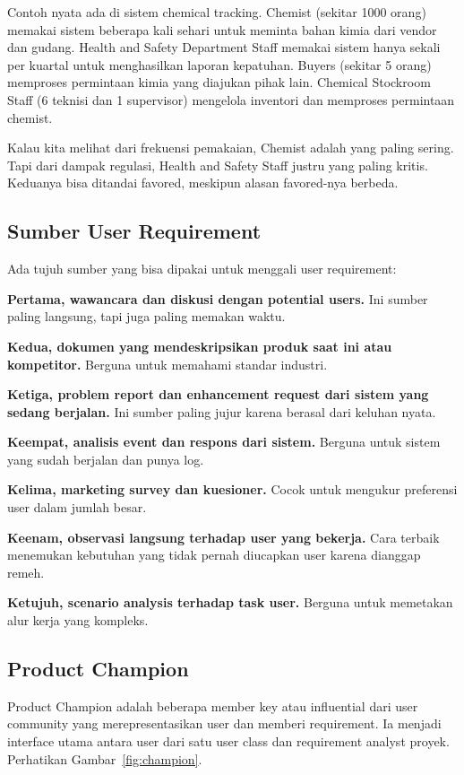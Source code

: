 \documentclass[11pt,a4paper]{article}
\begin{document}
Contoh nyata ada di sistem chemical tracking. Chemist (sekitar 1000 orang) memakai sistem beberapa kali sehari untuk meminta bahan kimia dari vendor dan gudang. Health and Safety Department Staff memakai sistem hanya sekali per kuartal untuk menghasilkan laporan kepatuhan. Buyers (sekitar 5 orang) memproses permintaan kimia yang diajukan pihak lain. Chemical Stockroom Staff (6 teknisi dan 1 supervisor) mengelola inventori dan memproses permintaan chemist.

Kalau kita melihat dari frekuensi pemakaian, Chemist adalah yang paling sering. Tapi dari dampak regulasi, Health and Safety Staff justru yang paling kritis. Keduanya bisa ditandai favored, meskipun alasan favored-nya berbeda.

\subsection{Sumber User Requirement}

Ada tujuh sumber yang bisa dipakai untuk menggali user requirement:

\textbf{Pertama, wawancara dan diskusi dengan potential users.} Ini sumber paling langsung, tapi juga paling memakan waktu.

\textbf{Kedua, dokumen yang mendeskripsikan produk saat ini atau kompetitor.} Berguna untuk memahami standar industri.

\textbf{Ketiga, problem report dan enhancement request dari sistem yang sedang berjalan.} Ini sumber paling jujur karena berasal dari keluhan nyata.

\textbf{Keempat, analisis event dan respons dari sistem.} Berguna untuk sistem yang sudah berjalan dan punya log.

\textbf{Kelima, marketing survey dan kuesioner.} Cocok untuk mengukur preferensi user dalam jumlah besar.

\textbf{Keenam, observasi langsung terhadap user yang bekerja.} Cara terbaik menemukan kebutuhan yang tidak pernah diucapkan user karena dianggap remeh.

\textbf{Ketujuh, scenario analysis terhadap task user.} Berguna untuk memetakan alur kerja yang kompleks.

\subsection{Product Champion}

Product Champion adalah beberapa member key atau influential dari user community yang merepresentasikan user dan memberi requirement. Ia menjadi interface utama antara user dari satu user class dan requirement analyst proyek. Perhatikan Gambar~\ref{fig:champion}.
\end{document}
